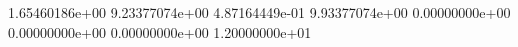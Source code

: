  1.65460186e+00
 9.23377074e+00
 4.87164449e-01
 9.93377074e+00
 0.00000000e+00
 0.00000000e+00
 0.00000000e+00
 1.20000000e+01
